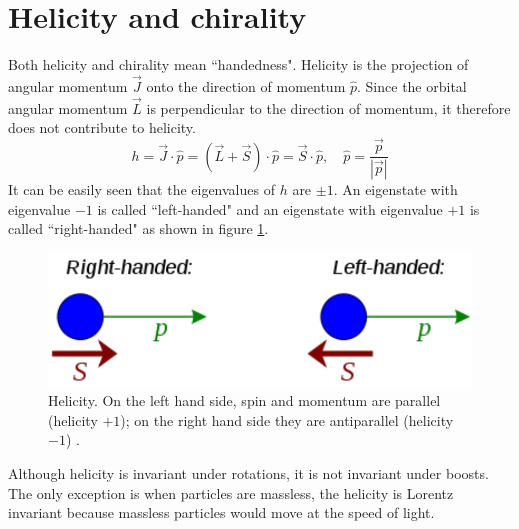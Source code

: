 \documentclass[12pt]{report}
\begin{document}
\section{Helicity and chirality}
Both helicity and chirality mean ``handedness". %
Helicity is the projection of angular momentum $\vec{J}$ onto the direction of momentum $\hat{p}$.
Since the orbital angular momentum $\vec{L}$ is perpendicular to the direction of momentum, it therefore does not contribute to helicity.
\begin{equation}
h = \vec{J} \cdot \hat{p} = (\vec{L} + \vec{S}) \cdot \hat{p} = \vec{S} \cdot \hat{p}, \quad 
\hat{p} = \frac{\vec{p}}{|\vec{p}|}
\end{equation}
It can be easily seen that the eigenvalues of $h$ are $\pm 1$.
An eigenstate with eigenvalue $-1$ is called ``left-handed" and an eigenstate with eigenvalue $+1$ is called ``right-handed" as shown in figure \ref{fig: helicity}.
\begin{figure}
\centering
\includegraphics[scale=0.8]{figures/380px-Right_left_helicity.pdf}
\caption{Helicity. On the left hand side, spin and momentum are parallel (helicity $+1$); on the right hand side they are antiparallel (helicity $-1$) \cite{helicity}.} %
\label{fig: helicity}
\end{figure}
Although helicity is invariant under rotations, it is not invariant under boosts.
The only exception is when particles are massless, the helicity is Lorentz invariant because massless particles would move at the speed of light.
\end{document}
